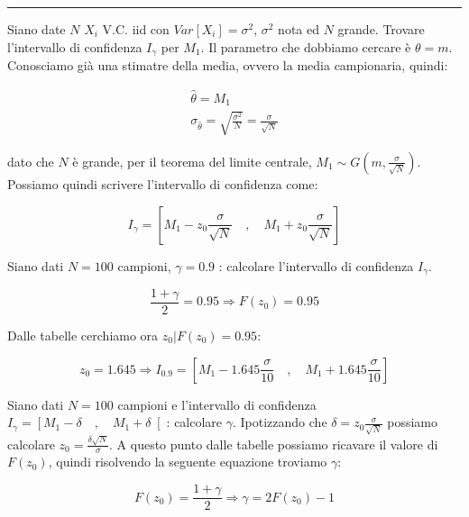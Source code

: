 \begin{center} \rule{300pt}{1pt} \end{center}
\begin{esempio} %
Siano date $N$ $X_i$ V.C. iid con $Var[X_i]=\sigma^2$, $\sigma^2$ nota ed $N$ grande. Trovare l'intervallo di confidenza $I_\gamma$ per $M_1$.\newline
Il parametro che dobbiamo cercare è $\theta=m$. Conosciamo già una stimatre della media, ovvero la media campionaria, quindi:
 
 \begin{gather*}
    \hat{\theta}=M_1 \\
    \sigma_{\hat{\theta}}=\sqrt{\frac{\sigma^2}{N}}=\frac{\sigma}{\sqrt{N}}
 \end{gather*}
 
dato che $N$ è grande, per il teorema del limite centrale, $M_1 \sim G(m,\frac{\sigma}{\sqrt{N}})$. Possiamo quindi scrivere l'intervallo di confidenza come:

  \[ I_\gamma = \left[ M_1-z_0\frac{\sigma}{\sqrt{N}} \quad ,\quad M_1+z_0\frac{\sigma}{\sqrt{N}} \right]  \]
\end{esempio}
\begin{esempio} %
Siano dati $N=100$ campioni, $\gamma=0.9$ : calcolare l'intervallo di confidenza $I_\gamma$.

  \[ \frac{1+\gamma}{2}=0.95 \Longrightarrow F(z_0)=0.95 \]
  
Dalle tabelle cerchiamo ora $z_0 | F(z_0)=0.95$:

  \[ z_0=1.645 \Longrightarrow I_{0.9}=\left[ M_1-1.645\frac{\sigma}{10} \quad ,\quad M_1+1.645\frac{\sigma}{10} \right]  \]
\end{esempio}
\begin{esempio} %
Siano dati $N=100$ campioni e l'intervallo di confidenza $I_\gamma=\left[ M_1-\delta \quad ,\quad M_1+\delta \right[ $: calcolare $\gamma$.\newline
Ipotizzando che $\delta=z_0\frac{\sigma}{\sqrt{N}}$ possiamo calcolare $z_0=\frac{\delta\sqrt{N}}{\sigma}$. A questo punto dalle tabelle possiamo ricavare il valore di $F(z_0)$, quindi risolvendo la seguente equazione troviamo $\gamma$:

  \[ F(z_0)=\frac{1+\gamma}{2} \Longrightarrow \gamma= 2F(z_0)-1 \]
\end{esempio}
